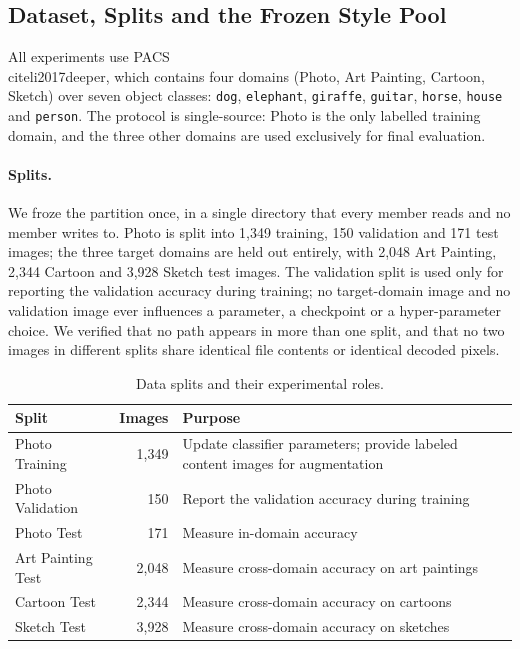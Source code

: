 ﻿%
\subsection{Dataset, Splits and the Frozen Style Pool}
\label{sec:dataset}

All experiments use PACS~\\cite{li2017deeper}, which contains four domains
(Photo, Art Painting, Cartoon, Sketch) over seven object classes:
\texttt{dog}, \texttt{elephant}, \texttt{giraffe}, \texttt{guitar},
\texttt{horse}, \texttt{house} and \texttt{person}. The protocol is
single-source: Photo is the only labelled training domain, and the three
other domains are used exclusively for final evaluation.

\paragraph{Splits.}
We froze the partition once, in a single directory that every member reads
and no member writes to. Photo is split into 1{,}349 training, 150
validation and 171 test images; the three target domains are held out
entirely, with 2{,}048 Art Painting, 2{,}344 Cartoon and 3{,}928 Sketch
test images. The validation split is used only for reporting the validation
accuracy during training; no target-domain image and no validation image
ever influences a parameter, a checkpoint or a hyper-parameter choice. We
verified that no path appears in more than one split, and that no two
images in different splits share identical file contents or identical
decoded pixels.

\begin{table}[t]
\caption{Data splits and their experimental roles.}
\label{tab:splits}
\centering
\small
\begin{tabular}{@{}lrp{4.4cm}@{}}
\toprule
Split & Images & Purpose \\
\midrule
Photo Training    & 1,349 & Update classifier parameters; provide labeled content images for augmentation \\
Photo Validation  & 150   & Report the validation accuracy during training \\
Photo Test        & 171   & Measure in-domain accuracy \\
Art Painting Test & 2,048 & Measure cross-domain accuracy on art paintings \\
Cartoon Test      & 2,344 & Measure cross-domain accuracy on cartoons \\
Sketch Test       & 3,928 & Measure cross-domain accuracy on sketches \\
\bottomrule
\end{tabular}
\end{table}

